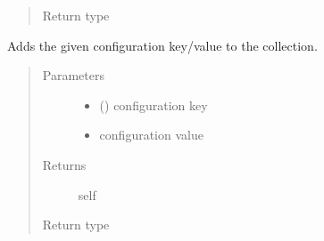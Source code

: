 \documentclass[letterpaper,10pt,english]{sphinxmanual}
\begin{document}
\begin{fulllineitems}
\begin{fulllineitems}
\begin{quote}
\begin{description}
\item[{Return type}] \leavevmode
{\hyperref[\detokenize{autoapi/pine/client/models/index:pine.client.models.CollectionBuilder}]{}}

\end{description}\end{quote}

\end{fulllineitems}


\begin{fulllineitems}
\label{\detokenize{autoapi/pine/client/models/index:pine.client.models.CollectionBuilder.configuration}}
Adds the given configuration key/value to the collection.
\begin{quote}\begin{description}
\item[{Parameters}] \leavevmode\begin{itemize}
\item {} 
 () \textendash{} configuration key

\item {} 
 \textendash{} configuration value

\end{itemize}

\item[{Returns}] \leavevmode
self

\item[{Return type}] \leavevmode
{\hyperref[\detokenize{autoapi/pine/client/models/index:pine.client.models.CollectionBuilder}]{}}

\end{description}\end{quote}

\end{fulllineitems}


\end{fulllineitems}
\end{document}
